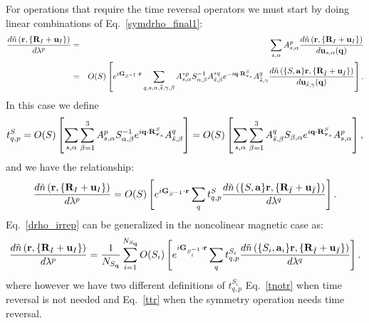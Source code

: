 \documentclass[12pt,a4paper,twoside]{report}
\begin{document}
For operations that require the time reversal operators we must start by doing linear combinations of 
Eq.~\ref{symdrho_final1}:
\begin{eqnarray}
{d \tilde n\left({\bf r}, \{{\bf R}_I + {\bf u}_I\}\right)
\over d \lambda^p}&=&
\sum_{s,\alpha} A^p_{s,\alpha}
{d \tilde n\left({\bf r}, \{{\bf R}_I + {\bf u}_I\}\right)
\over d {\bf u}_{s,\alpha}({\bf q})} 
\nonumber \\ 
&=& O(S)\left[ e^{i{\bf G}_{S^{-1}} \cdot {\bf r}} \sum_{q,s,\alpha,\bar{\bar s}, \gamma, \beta} 
A^{*p}_{s,\alpha} S^{-1}_{\alpha,\beta} 
A^{*q}_{\bar s,\beta} e^{-i{\bf q}\cdot {\bf R}^S_{{\boldsymbol{\tau}_s}}}
A^{q}_{\bar {\bar s},\gamma}
{d \tilde n\left(\{S,{\bf a}\} {\bf r}, \{{\bf R}_{\bar I} + {\bf u}_{\bar I}\}\right)
\over d {\bf u}_{\bar{\bar s},\gamma} ({\bf q})} \right].
\label{symdrho_final_irrep1} \nonumber \\
\end{eqnarray}
In this case we define
\begin{equation}
t_{q,p}^S= O(S)\left[
\sum_{s,\alpha}
\sum_{\beta=1}^3 A^p_{s,\alpha} S^{-1}_{\alpha,\beta} e^{i{\bf q}\cdot {\bf R}^S_{{\boldsymbol{\tau}_s}}} A^{q}_{\bar s,\beta}\right] = O(S) \left[\sum_{s,\alpha}
\sum_{\beta=1}^3 A^{q}_{\bar s,\beta} S_{\beta,\alpha} e^{i{\bf q}\cdot {\bf R}^S_{{\boldsymbol{\tau}_s}}} A^p_{s,\alpha}\right],
\label{ttr}
\end{equation}
and we have the relationship:
\begin{equation}
{d \tilde n\left({\bf r}, \{{\bf R}_I + {\bf u}_I\}\right) \over d \lambda^p} = O(S) \left[ e^{i{\bf G}_{S^{-1}} \cdot {\bf r}}
\sum_q t_{q,p}^S {d \tilde n\left(\{S,{\bf a}\} {\bf r}, \{{\bf R}_{\bar I} + {\bf u}_{\bar I}\}\right) \over d \lambda^q}\right]. 
\end{equation}
Eq.~\ref{drho_irrep} can be generalized
in the noncolinear magnetic case as:
\begin{equation}
{d \tilde n\left({\bf r}, \{{\bf R}_I + {\bf u}_I\}\right) \over d \lambda^p} = {1\over N_{S_{\bf q}}} \sum_{i=1}^{N_{S_{\bf q}}} O(S_i)\left[ e^{i{\bf G}_{S_i^{-1}} \cdot {\bf r}}
\sum_q t_{q,p}^{S_i} {d \tilde n\left(\{S_i,{\bf a}_i\} {\bf r}, \{{\bf R}_{\bar I} + {\bf u}_{\bar I}\}\right) \over d \lambda^q} \right].
\label{drho_irrep_1}
\end{equation}
where however we have two different definitions of $t_{q,p}^{S_i}$ Eq.~\ref{tnotr} when time reversal is not needed and Eq.~\ref{ttr} when the symmetry operation needs time reversal.
\end{document}

